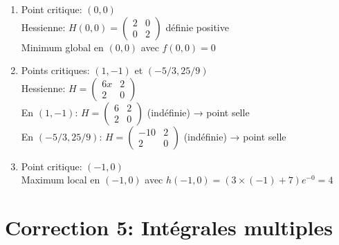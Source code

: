 \begin{enumerate}
    \item Point critique: $(0,0)$\\
    Hessienne: $H(0,0) = \begin{pmatrix} 2 & 0 \\ 0 & 2 \end{pmatrix}$ définie positive\\
    Minimum global en $(0,0)$ avec $f(0,0)=0$
    
    \item Points critiques: $(1,-1)$ et $(-5/3,25/9)$\\
    Hessienne: $H = \begin{pmatrix} 6x & 2 \\ 2 & 0 \end{pmatrix}$\\
    En $(1,-1)$: $H = \begin{pmatrix} 6 & 2 \\ 2 & 0 \end{pmatrix}$ (indéfinie) → point selle\\
    En $(-5/3,25/9)$: $H = \begin{pmatrix} -10 & 2 \\ 2 & 0 \end{pmatrix}$ (indéfinie) → point selle
    
    \item Point critique: $(-1,0)$\\
    Maximum local en $(-1,0)$ avec $h(-1,0) = (3\times(-1)+7)e^{-0} = 4$
\end{enumerate}

\section*{Correction 5: Intégrales multiples}


